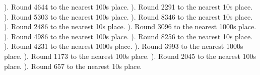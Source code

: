 \documentclass{article}%
\begin{document}
\newline%
\newline%
). Round 4644 to the nearest 100s place.%
\newline%
\newline%
). Round 2291 to the nearest 10s place.%
\newline%
\newline%
). Round 5303 to the nearest 100s place.%
\newline%
\newline%
). Round 8346 to the nearest 10s place.%
\newline%
\newline%
). Round 2486 to the nearest 10s place.%
\newline%
\newline%
). Round 3096 to the nearest 1000s place.%
\newline%
\newline%
). Round 4986 to the nearest 100s place.%
\newline%
\newline%
). Round 8256 to the nearest 10s place.%
\newline%
\newline%
). Round 4231 to the nearest 1000s place.%
\newline%
\newline%
). Round 3993 to the nearest 1000s place.%
\newline%
\newline%
). Round 1173 to the nearest 100s place.%
\newline%
\newline%
). Round 2045 to the nearest 100s place.%
\newline%
\newline%
). Round 657 to the nearest 10s place.%
\newline%
\newline%
\end{document}
